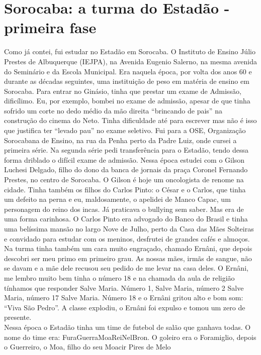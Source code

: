 \documentclass[12pt,brazil,]{book}
\begin{document}
\section{Sorocaba: a turma do Estadão - primeira
fase}\label{sorocaba-a-turma-do-estaduxe3o---primeira-fase}

Como já contei, fui estudar no Estadão em Sorocaba. O Instituto de
Ensino Júlio Prestes de Albuquerque (IEJPA), na Avenida Eugenio Salerno,
na mesma avenida do Seminário e da Escola Municipal. Era naquela época,
por volta dos anos 60 e durante as décadas seguintes, uma instituição de
peso em matéria de ensino em Sorocaba. Para entrar no Ginásio, tinha que
prestar um exame de Admissão, dificílimo. Eu, por exemplo, bombei no
exame de admissão, apesar de que tinha sofrido um corte no dedo médio da
mão direita ``brincando de pais'' na construção do cinema do Neto. Tinha
dificuldade até para escrever mas não é isso que justifica ter ``levado
pau'' no exame seletivo. Fui para a OSE, Organização Sorocabana de
Ensino, na rua da Penha perto da Padre Luiz, onde cursei a primeira
série. Na segunda série pedi transferência para o Estadão, tendo dessa
forma driblado o difícil exame de admissão. Nessa época estudei com o
Gilson Luchesi Delgado, filho do dono da banca de jornais da praça
Coronel Fernando Prestes, no centro de Sorocaba. O Gilson é hoje um
oncologista de renome na cidade. Tinha também os filhos do Carlos Pinto:
o César e o Carlos, que tinha um defeito na perna e eu, maldosamente, o
apelidei de Manco Capac, um personagem do reino dos incas. Já praticava
o bullying sem saber. Mas era de uma forma carinhosa. O Carlos Pinto era
advogado do Banco do Brasil e tinha uma belíssima mansão no largo Nove
de Julho, perto da Casa das Mães Solteiras e convidado para estudar com
os meninos, desfrutei de grandes cafés e almoços. Na turma tinha também
um cara muito engraçado, chamado Ernâni, que depois descobri ser meu
primo em primeiro grau. As nossas mães, irmãs de sangue, não se davam e
a mãe dele recusou seu pedido de me levar na casa deles. O Ernâni, me
lembro muito bem tinha o número 18 e na chamada da aula de religião
tínhamos que responder Salve Maria. Número 1, Salve Maria, número 2
Salve Maria, número 17 Salve Maria. Número 18 e o Ernâni gritou alto e
bom som: ``Viva São Pedro''. A classe explodiu, o Ernâni foi expulso e
tomou um zero de presente.\\
Nessa época o Estadão tinha um time de futebol de salão que ganhava
todas. O nome do time era: FuraGuerraMoaReiNelBron. O goleiro era o
Foramiglio, depois o Guerreiro, o Moa, filho do seu Moacir Pires de Melo
\end{document}
